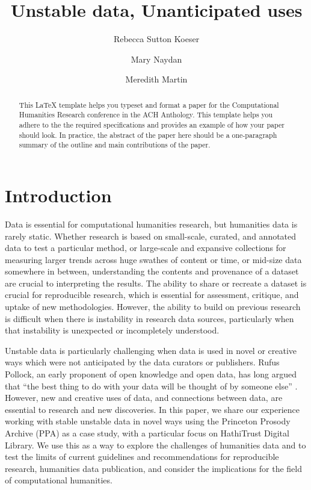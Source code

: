 \documentclass{anthology-ch}         %
\title{Unstable data, Unanticipated uses}
\author[1]{Rebecca Sutton Koeser}[
  orcid=0000-0002-8762-8057
]
\author[1]{Mary Naydan}[
  orcid=0000-0002-7960-3175
]
\author[1,2]{Meredith Martin}[
  orcid=0000-0003-0214-8757
]
\affiliation{1}{Center for Digital Humanities, Princeton University, Princeton, New Jersey, USA}
\begin{document}
\maketitle

\begin{abstract}
This LaTeX template helps you typeset and format a paper for the Computational Humanities Research conference in the ACH Anthology. This template helps you adhere to the the required specifications and provides an example of how your paper should look. In practice, the abstract of the paper here should be a one-paragraph summary of the outline and main contributions of the paper. 
\end{abstract}

\section{Introduction} 

Data is essential for computational humanities research, but humanities data is rarely static. Whether research is based on small-scale, curated, and annotated data to test a particular method, or large-scale and expansive collections for measuring larger trends across huge swathes of content or time, or mid-size data somewhere in between, understanding the contents and provenance of a dataset are crucial to interpreting the results. The ability to share or recreate a dataset is crucial for reproducible research, which is essential for assessment, critique, and uptake of new methodologies. However, the ability to build on previous research is difficult when there is instability in research data sources,  particularly when that instability is unexpected or incompletely understood. 

Unstable data is particularly challenging when data is used in novel or creative ways which were not anticipated by the data curators or publishers. Rufus Pollock, an early proponent of open knowledge and open data, has long argued that “the best thing to do with your data will be thought of by someone else” \cite{pollock_open_2011}. However, new and creative uses of data, and connections between data, are essential to research and new discoveries. In this paper, we share our experience working with stable unstable data in novel ways using the Princeton Prosody Archive (PPA) as a case study, with a particular focus on HathiTrust Digital Library. We use this as a way to explore the challenges of humanities data and to test the limits of current guidelines and  recommendations for reproducible research, humanities data publication, and consider the implications for the field of computational humanities.
\end{document}
